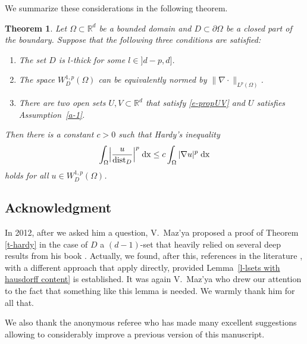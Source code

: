 \documentclass[10pt,leqno]{amsart}
\newtheorem{theorem}{Theorem}[section]
\theoremstyle{definition}
\numberwithin{equation}{section}
\begin{document}
We summarize these considerations in the following theorem.

\begin{theorem} \label{t-hardy1}
 Let $\Omega \subset {{\mathbb R}}^d$ be a bounded domain and $D \subset \partial \Omega$
 be a closed part of the boundary. Suppose that the following three conditions
 are satisfied:
 \begin{enumerate}
  \item The set $D$ is $l$-thick for some $l \in {]d-p,d]}$.
  \item The space $W^{1,p}_D(\Omega)$ can be equivalently normed by
	$\|\nabla \cdot \|_{L^p(\Omega)}$.
  \item There are two open sets $U, V \subset {{\mathbb R}}^d$ that satisfy
	\eqref{e-propUV} and $U$ satisfies Assumption~\ref{a-1}.
 \end{enumerate}
 Then there is a constant $c>0$ such that Hardy's inequality
 \begin{equation*}
  \int_\Omega \Bigl| \frac{u}{{\operatorname{dist}}_D} \Bigr|^p \; {{\mathrm{d}}} \mathrm{x}  \le c
	\int_\Omega |\nabla u|^p \; {{\mathrm{d}}} \mathrm{x}
 \end{equation*}
 holds for all $u \in W^{1,p}_D(\Omega)$.
\end{theorem}

\subsection*{Acknowledgment} 
 In 2012, after we asked him a question, V.~Maz'ya proposed a
  proof \cite{mazcomm} of Theorem \ref{t-hardy} in the case of $D$ a
  $(d-1)$-set that heavily relied on 
  several deep results from his book \cite{mazsob}. Actually, we found, after
  this, references in the literature \cite{korte}, \cite{juha} with a different
  approach that apply directly, provided Lemma~\ref{l-lsets with hausdorff
  content} is established. It was again V.~Maz'ya who drew
  our attention to the fact that something like this lemma is needed.
  We warmly thank him for all that.

  We also thank the anonymous referee who has made many excellent suggestions
  allowing to considerably improve a previous version of this
manuscript.
\end{document}
